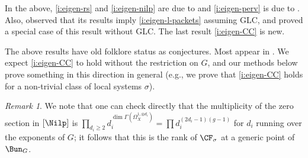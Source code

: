 \documentclass[9pt]{amsart}
\theoremstyle{remark}
\newtheorem{rem}[subsubsection]{Remark}
\theoremstyle{definition}
\theoremstyle{remark}
\numberwithin{equation}{section}
\begin{document}
In the above, \eqref{i:eigen-rs} and \eqref{i:eigen-nilp} 
are due to \cite{AGKRRV} and \eqref{i:eigen-perv} is due
to \cite{FR}. Also, \cite{FR} observed that its results imply
\eqref{i:eigen-l-packets} assuming GLC, and 
proved a special case of this result without GLC. The last result
\eqref{i:eigen-CC} is new.

\medskip 

The above results have old folklore status as conjectures. 
Most appear in \cite[Conj. 6.3.2]{L}. We expect
\eqref{i:eigen-CC} to hold without the restriction on $G$,
and our methods below prove something in this direction in general
(e.g., we prove that \eqref{i:eigen-CC} holds for a non-trivial class
of local systems $\sigma$).

\begin{rem}

We note that one can check directly that the multiplicity of the zero section in 
$[\Nilp]$ is $\prod_{d_i \geq 2} d_i^{\dim \Gamma(\Omega_X^{1,\otimes d_i})} = 
\prod d_i^{(2d_i-1)(g-1)}$ for $d_i$ running over the exponents
of $G$; it follows that this is the rank of $\CF_{\sigma}$ at a generic
point of $\Bun_G$.

\end{rem}
\end{document}
